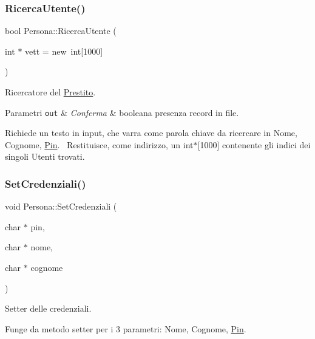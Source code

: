 \subsubsection{\texorpdfstring{Ricerca\+Utente()}{RicercaUtente()}}
{\footnotesize\ttfamily bool Persona\+::\+Ricerca\+Utente (\begin{DoxyParamCaption}\item[{int $\ast$}]{vett = {\ttfamily new~int\mbox{[}1000\mbox{]}} }\end{DoxyParamCaption})}



Ricercatore del \mbox{\hyperlink{class_prestito}{Prestito}}. 


\begin{DoxyParams}[1]{Parametri}
\mbox{\tt out}  & {\em Conferma} & booleana presenza record in file.\\
\hline
\end{DoxyParams}
Richiede un testo in input, che varra\textquotesingle{} come parola chiave da ricercare in Nome, Cognome, \mbox{\hyperlink{class_pin}{Pin}}.~\newline
Restituisce, come indirizzo, un int$\ast$\mbox{[}1000\mbox{]} contenente gli indici dei singoli Utenti trovati. \mbox{\label{class_persona_a619e90d3b2036e78778b590ea1d51bcc}} 
\subsubsection{\texorpdfstring{Set\+Credenziali()}{SetCredenziali()}}
{\footnotesize\ttfamily void Persona\+::\+Set\+Credenziali (\begin{DoxyParamCaption}\item[{char $\ast$}]{pin,  }\item[{char $\ast$}]{nome,  }\item[{char $\ast$}]{cognome }\end{DoxyParamCaption})}



Setter delle credenziali. 

Funge da metodo setter per i 3 parametri\+: Nome, Cognome, \mbox{\hyperlink{class_pin}{Pin}}. \mbox{\label{class_persona_aa3d04ab73400a071421c979e692f93b3}} 
